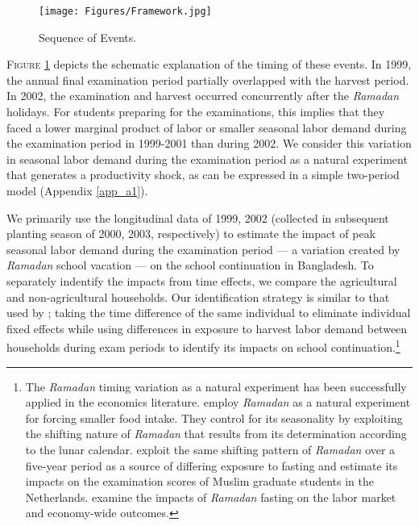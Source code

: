 \documentclass[12pt,letterpaper]{article}
\newcommand{\0}{\ensuremath{\mbox{\boldmath $0$}}}
\begin{document}
\begin{figure}[bt]
\centering
\texttt{[image: Figures/Framework.jpg]}\\
\caption{Sequence of Events.\protect\footnotemark}
\label{schedule}
\end{figure}


\textsc{\small Figure \ref{schedule}} depicts the schematic explanation of the timing of these events. In 1999, the annual final examination period partially overlapped with the harvest period. In 2002, the examination and harvest occurred concurrently after the \textit{Ramadan} holidays. For students preparing for the examinations, this implies that they faced a lower marginal product of labor or smaller seasonal labor demand during the examination period in 1999-2001 than during 2002. We consider this variation in seasonal labor demand during the examination period as a natural experiment that generates a productivity shock, as can be expressed in a simple two-period model (Appendix \ref{app_a1}).

We primarily use the longitudinal data of 1999, 2002 (collected in subsequent planting season of 2000, 2003, respectively) to estimate the impact of peak seasonal labor demand during the examination period --- a variation created by \textit{Ramadan} school vacation --- on the school continuation in Bangladesh. To separately indentify the impacts from time effects, we compare the agricultural and non-agricultural households. Our identification strategy is similar to that used by \citet{OosterbeekKlaauw2013}; taking the time difference of the same individual to eliminate individual fixed effects while using differences in exposure to harvest labor demand between households during exam periods to identify its impacts on school continuation.\footnote{The \textit{Ramadan} timing variation as a natural experiment has been successfully applied in the economics literature. \citet{AlmondMazumder2011} employ \textit{Ramadan} as a natural experiment for forcing smaller food intake. They control for its seasonality by exploiting the shifting nature of \textit{Ramadan} that results from its determination according to the lunar calendar. \citet{OosterbeekKlaauw2013} exploit the same shifting pattern of \textit{Ramadan} over a five-year period as a source of differing exposure to fasting and estimate its impacts on the examination scores of Muslim graduate students in the Netherlands. \citet{Campante2013} examine the impacts of \textit{Ramadan} fasting on the labor market and economy-wide outcomes. }
\end{document}
